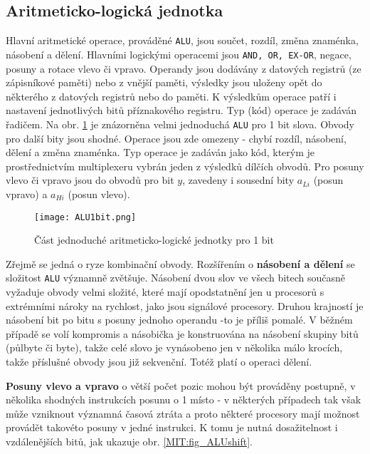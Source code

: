     \subsection{Aritmeticko-logická jednotka}\label{ces:IchapIVsecIIssecII}
      Hlavní aritmetické operace, prováděné \texttt{ALU}, jsou součet, rozdíl, změna znaménka, 
      násobení a dělení. Hlavními logickými operacemi jsou \texttt{AND, OR, EX-OR}, negace, posuny 
      a rotace vlevo či vpravo. Operandy jsou dodávány z datových registrů (ze zápisníkové paměti) 
      nebo z vnější paměti, výsledky jsou uloženy opět do některého z datových registrů nebo do 
      paměti. K výsledkům operace patří i nastavení jednotlivých bitů příznakového registru. Typ 
      (kód) operace je zadáván řadičem. Na obr. \ref{MIT:fig_ALU1b} je znázorněna velmi jednoduchá 
      \texttt{ALU} pro 1 bit slova. Obvody pro další bity jsou shodné. Operace jsou zde omezeny - 
      chybí rozdíl, násobení, dělení a změna znaménka. Typ operace je zadáván jako kód, kterým je 
      prostřednictvím multiplexeru vybrán jeden z výsledků dílčích obvodů. Pro posuny vlevo či 
      vpravo jsou do obvodů pro bit \(y\), zavedeny i sousední bity \(a_{Li}\) (posun vpravo) 
      a \(a_{Hi}\) (posun vlevo).

      \begin{figure}[ht!] %
        \centering
        \texttt{[image: ALU1bit.png]}
        \caption{Část jednoduché aritmeticko-logické jednotky pro 1 bit}
        \label{MIT:fig_ALU1b}
      \end{figure}

       Zřejmě se jedná o ryze kombinační obvody. Rozšířením o \textbf{násobení a dělení} se 
       složitost \texttt{ALU} významně zvětšuje. Násobení dvou slov ve všech bitech současně 
       vyžaduje obvody velmi složité, které mají opodstatnění jen u procesorů s extrémními nároky 
       na rychlost, jako jsou signálové procesory. Druhou krajností je násobení bit po bitu s 
       posuny jednoho operandu -to je příliš pomalé. V běžném případě se volí kompromis a násobička 
       je konstruována na násobení skupiny bitů (půlbyte či byte), takže celé slovo je vynásobeno 
       jen v několika málo krocích, takže příslušné obvody jsou již sekvenční. Totéž platí o 
       operaci dělení.
       
       \textbf{Posuny vlevo a vpravo} o větší počet pozic mohou být prováděny postupně, v několika 
       shodných instrukcích posunu o 1 místo - v některých případech tak však může vzniknout 
       významná časová ztráta a proto některé procesory mají možnost provádět takovéto posuny v 
       jedné instrukci. K tomu je nutná dosažitelnost i vzdálenějších bitů, jak ukazuje obr. 
       \ref{MIT:fig_ALUshift}.
              
